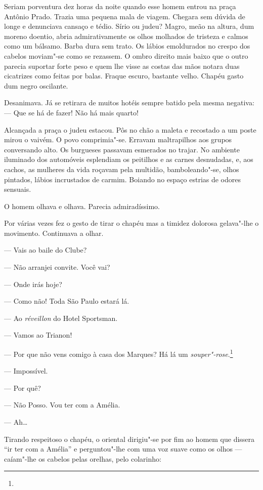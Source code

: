 Seriam porventura dez horas da noite quando esse homem entrou na praça
Antônio Prado. Trazia uma pequena mala de viagem. Chegara sem dúvida de
longe e denunciava cansaço e tédio. Sírio ou judeu? Magro, meão na
altura, dum moreno doentio, abria admirativamente os olhos molhados de
tristeza e calmos como um bálsamo. Barba dura sem trato. Os lábios
emoldurados no crespo dos cabelos moviam"-se como se rezassem. O ombro
direito mais baixo que o outro parecia suportar forte peso e quem lhe
visse as costas das mãos notara duas cicatrizes como feitas por balas.
Fraque escuro, bastante velho. Chapéu gasto dum negro oscilante.

Desanimava. Já se retirara de muitos hotéis sempre batido pela mesma
negativa: --- Que se há de fazer! Não há mais quarto!

Alcançada a praça o judeu estacou. Pôs no chão a maleta e recostado a um
poste mirou o vaivém. O povo comprimia"-se. Erravam maltrapilhos aos
grupos conversando alto. Os burgueses passavam esmerados no trajar. No
ambiente iluminado dos automóveis esplendiam os peitilhos e as carnes
desnudadas, e, aos cachos, as mulheres da vida roçavam pela multidão,
bamboleando"-se, olhos pintados, lábios incrustados de carmim. Boiando no
espaço estrias de odores sensuais.

O homem olhava e olhava. Parecia admiradíssimo.

Por várias vezes fez o gesto de tirar o chapéu mas a timidez dolorosa
gelava"-lhe o movimento. Continuava a olhar.

--- Vais ao baile do Clube?

--- Não arranjei convite. Você vai?

--- Onde irás hoje?

--- Como não! Toda São Paulo estará lá.

--- Ao \emph{réveillon} do Hotel Sportsman.

--- Vamos ao Trianon!

--- Por que não vens comigo à casa dos Marques? Há lá um
\emph{souper"-rose}.\footnote{} %

--- Impossível.

--- Por quê?

--- Não Posso. Vou ter com a Amélia.

--- Ah\ldots{}

Tirando respeitoso o chapéu, o oriental dirigiu"-se por fim ao homem que
dissera ``ir ter com a Amélia'' e perguntou"-lhe com uma voz suave como
os olhos --- caíam"-lhe os cabelos pelas orelhas, pelo colarinho:


